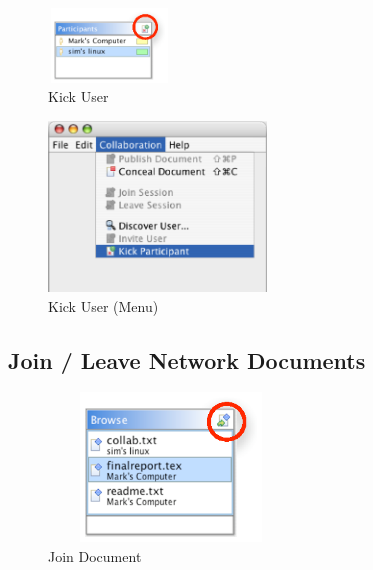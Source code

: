 \documentclass[11pt,a4paper]{article}
\begin{document}
\begin{figure}[H]
\begin{center}
  \includegraphics[height=0.78in, width=1.28in]{../images/usermanual/g_pview_kick.eps}
\caption{Kick User}
\label{default}
\end{center}
\end{figure}

\begin{figure}[H]
\begin{center}
  \includegraphics[height=1.78in, width=2.28in]{../images/usermanual/menu_collab_kick.eps}
\caption{Kick User (Menu)}
\label{default}
\end{center}
\end{figure}

\subsection{Join / Leave Network Documents}
\label{join_leave_documents}
\begin{figure}[H]
\begin{center}
  \includegraphics[height=1.56in, width=2.56in]{../images/usermanual/g_bview_join.eps}
\caption{Join Document}
\label{default}
\end{center}
\end{figure}
\end{document}
